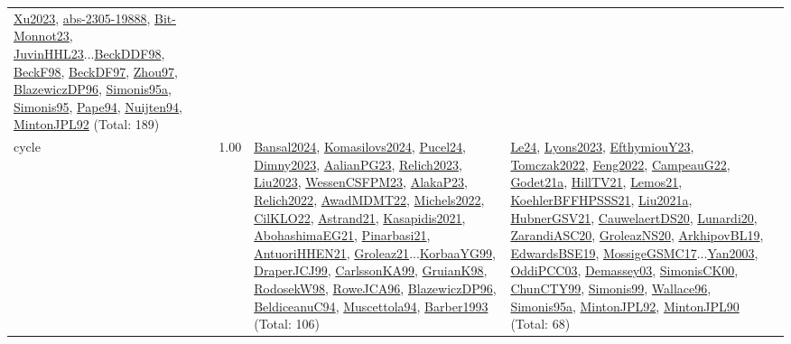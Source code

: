 {\begin{longtable}{p{3cm}r>{\raggedright\arraybackslash}p{6cm}>{\raggedright\arraybackslash}p{6cm}>{\raggedright\arraybackslash}p{8cm}}
\hyperref[detail:Xu2023]{Xu2023}, \hyperref[detail:abs-2305-19888]{abs-2305-19888}, \hyperref[detail:Bit-Monnot23]{Bit-Monnot23}, \hyperref[detail:JuvinHHL23]{JuvinHHL23}...\hyperref[detail:BeckDDF98]{BeckDDF98}, \hyperref[detail:BeckF98]{BeckF98}, \hyperref[detail:BeckDF97]{BeckDF97}, \hyperref[detail:Zhou97]{Zhou97}, \hyperref[detail:BlazewiczDP96]{BlazewiczDP96}, \hyperref[detail:Simonis95a]{Simonis95a}, \hyperref[detail:Simonis95]{Simonis95}, \hyperref[detail:Pape94]{Pape94}, \hyperref[detail:Nuijten94]{Nuijten94}, \hyperref[detail:MintonJPL92]{MintonJPL92} (Total: 189)\\
\index{cycle}\index{Constraints!cycle}cycle &  1.00 & \hyperref[detail:Bansal2024]{Bansal2024}, \hyperref[detail:Komasilovs2024]{Komasilovs2024}, \hyperref[detail:Pucel24]{Pucel24}, \hyperref[detail:Dimny2023]{Dimny2023}, \hyperref[detail:AalianPG23]{AalianPG23}, \hyperref[detail:Relich2023]{Relich2023}, \hyperref[detail:Liu2023]{Liu2023}, \hyperref[detail:WessenCSFPM23]{WessenCSFPM23}, \hyperref[detail:AlakaP23]{AlakaP23}, \hyperref[detail:Relich2022]{Relich2022}, \hyperref[detail:AwadMDMT22]{AwadMDMT22}, \hyperref[detail:Michels2022]{Michels2022}, \hyperref[detail:CilKLO22]{CilKLO22}, \hyperref[detail:Astrand21]{Astrand21}, \hyperref[detail:Kasapidis2021]{Kasapidis2021}, \hyperref[detail:AbohashimaEG21]{AbohashimaEG21}, \hyperref[detail:Pinarbasi21]{Pinarbasi21}, \hyperref[detail:AntuoriHHEN21]{AntuoriHHEN21}, \hyperref[detail:Groleaz21]{Groleaz21}...\hyperref[detail:KorbaaYG99]{KorbaaYG99}, \hyperref[detail:DraperJCJ99]{DraperJCJ99}, \hyperref[detail:CarlssonKA99]{CarlssonKA99}, \hyperref[detail:GruianK98]{GruianK98}, \hyperref[detail:RodosekW98]{RodosekW98}, \hyperref[detail:RoweJCA96]{RoweJCA96}, \hyperref[detail:BlazewiczDP96]{BlazewiczDP96}, \hyperref[detail:BeldiceanuC94]{BeldiceanuC94}, \hyperref[detail:Muscettola94]{Muscettola94}, \hyperref[detail:Barber1993]{Barber1993} (Total: 106) & \hyperref[detail:Le24]{Le24}, \hyperref[detail:Lyons2023]{Lyons2023}, \hyperref[detail:EfthymiouY23]{EfthymiouY23}, \hyperref[detail:Tomczak2022]{Tomczak2022}, \hyperref[detail:Feng2022]{Feng2022}, \hyperref[detail:CampeauG22]{CampeauG22}, \hyperref[detail:Godet21a]{Godet21a}, \hyperref[detail:HillTV21]{HillTV21}, \hyperref[detail:Lemos21]{Lemos21}, \hyperref[detail:KoehlerBFFHPSSS21]{KoehlerBFFHPSSS21}, \hyperref[detail:Liu2021a]{Liu2021a}, \hyperref[detail:HubnerGSV21]{HubnerGSV21}, \hyperref[detail:CauwelaertDS20]{CauwelaertDS20}, \hyperref[detail:Lunardi20]{Lunardi20}, \hyperref[detail:ZarandiASC20]{ZarandiASC20}, \hyperref[detail:GroleazNS20]{GroleazNS20}, \hyperref[detail:ArkhipovBL19]{ArkhipovBL19}, \hyperref[detail:EdwardsBSE19]{EdwardsBSE19}, \hyperref[detail:MossigeGSMC17]{MossigeGSMC17}...\hyperref[detail:Yan2003]{Yan2003}, \hyperref[detail:OddiPCC03]{OddiPCC03}, \hyperref[detail:Demassey03]{Demassey03}, \hyperref[detail:SimonisCK00]{SimonisCK00}, \hyperref[detail:ChunCTY99]{ChunCTY99}, \hyperref[detail:Simonis99]{Simonis99}, \hyperref[detail:Wallace96]{Wallace96}, \hyperref[detail:Simonis95a]{Simonis95a}, \hyperref[detail:MintonJPL92]{MintonJPL92}, \hyperref[detail:MintonJPL90]{MintonJPL90} (Total: 68) & 
\end{longtable}}
